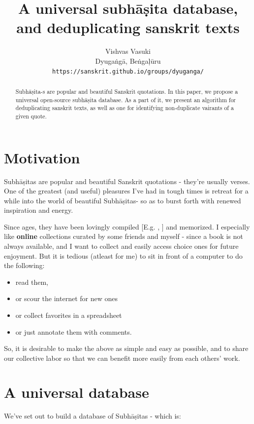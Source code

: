 \documentclass[11pt]{article}
\title{A universal subhāṣita database, and deduplicating sanskrit texts}
\author{Vishvas Vasuki \\
  Dyugaṅgā, Beṅgaḷūru \\
  {\tt https://sanskrit.github.io/groups/dyuganga/}
\\}
\date{}
\begin{document}
\maketitle
\begin{abstract}
Subhāṣita-s are popular and beautiful Sanskrit quotations. In this paper, we propose a universal open-source subhāṣita database. As a part of it, we present an algorithm for deduplicating sanskrit texts, as well as one for identifying non-duplicate vairants of a given quote.
\end{abstract}

\section{Motivation}
Subhāṣitas are popular and beautiful Sanskrit quotations - they're usually verses. One of the greatest (and useful) pleasures I've had in tough times is retreat for a while into the world of beautiful Subhāṣitas- so as to burst forth with renewed inspiration and energy. 

Since ages, they have been lovingly compiled [E.g. \cite{subhashita-1952}, \cite{mss-1974}] and memorized. I especially like \textbf{online} collections curated by some friends and myself - since a book is not always available, and I want to collect and easily access choice ones for future enjoyment. But it is tedious (atleast for me) to sit in front of a computer to do the following:

\begin{itemize}
\tightlist
\item
  read them,
\item
  or scour the internet for new ones
\item
  or collect favorites in a spreadsheet
\item
  or just annotate them with comments.
\end{itemize}

So, it is desirable to make the above as simple and easy as possible, and to share our collective labor so that we can benefit more easily from each others' work.

\section{A universal database}

We've set out to build a database of Subhāṣitas - which is:
\end{document}
